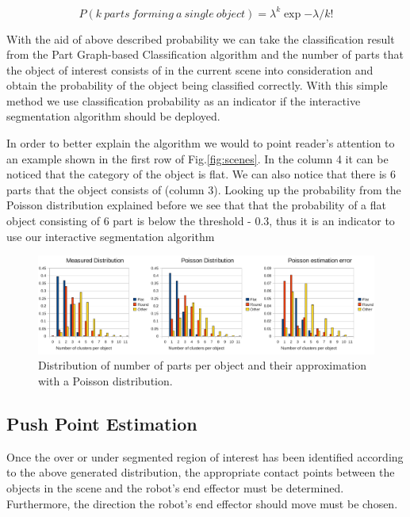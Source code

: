\begin{equation}
\label{eq:poisson}
P(k~parts~forming~a~single~object) = \lambda^k \exp{-\lambda} / k!
\end{equation}

With the aid of above described probability we can take the classification result from the Part Graph-based Classification algorithm and the number of parts that the object of interest consists of in the current scene into consideration and obtain the probability of the object being classified correctly. With this simple method we use classification probability as an indicator if the interactive segmentation algorithm should be deployed.  

In order to better explain the algorithm we would to point reader's attention to an example shown in the first row of Fig.\ref{fig:scenes}. In the column 4 it can be noticed that the category of the object is flat. We can also notice that there is 6 parts that the object consists of (column 3). Looking up the probability from the Poisson distribution explained before we see that that the probability of a flat object consisting of 6 part is below the threshold - $0.3$, thus it is an indicator to use our interactive segmentation algorithm



\begin{figure}[h!]
\centering
  \includegraphics[width=0.98\columnwidth, trim=0ex 0ex 53ex 0ex, clip]{figures/dataset_stats.pdf}
	\vspace{-2ex}
  \caption{Distribution of number of parts per object and their approximation with a Poisson distribution.}
  \label{fig:poisson}
\end{figure}

\subsection{Push Point Estimation}
\label{sec:push-point}
Once the over or under segmented region of interest has been identified 
according to the above generated distribution, the  appropriate contact
points  between the objects in   the   scene  and   the   robot's   end   
effector  must   be determined. Furthermore, the  direction   the robot's  end
effector should move must be chosen.

